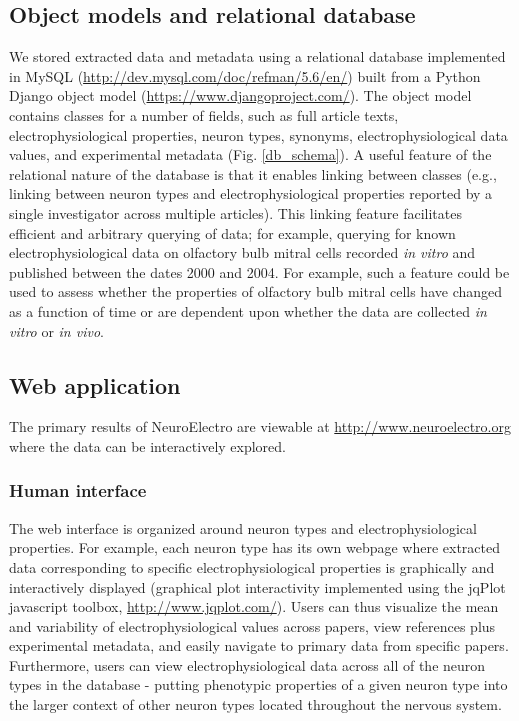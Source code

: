 \documentclass{template/frontiersSCNS} %
\begin{document}
\subsection{Object models and relational database}
We stored extracted data and metadata using a relational database implemented in MySQL (\url{http://dev.mysql.com/doc/refman/5.6/en/}) built from a Python Django object model (\url{https://www.djangoproject.com/}).  
The object model contains classes for a number of fields, such as full article texts, electrophysiological properties, neuron types, synonyms, electrophysiological data values, and experimental metadata (Fig. \ref{db_schema}).  
A useful feature of the relational nature of the database is that it enables linking between classes (e.g., linking between neuron types and electrophysiological properties reported by a single investigator across multiple articles). 
This linking feature facilitates efficient and arbitrary querying of data; 
for example, querying for known electrophysiological data on olfactory bulb mitral cells recorded \emph{in vitro} and published between the dates 2000 and 2004.  
For example, such a feature could be used to assess whether the properties of olfactory bulb mitral cells have changed as a function of time or are dependent upon whether the data are collected \emph{in vitro} or \emph{in vivo}.

\subsection{Web application}
The primary results of NeuroElectro are viewable at \url{http://www.neuroelectro.org} where the data can be interactively explored.  

\subsubsection{Human interface}
The web interface is organized around neuron types and electrophysiological properties.  
For example, each neuron type has its own webpage where extracted data corresponding to specific electrophysiological properties is graphically and interactively displayed (graphical plot interactivity implemented using the jqPlot javascript toolbox, \url{http://www.jqplot.com/}).  
Users can thus visualize the mean and variability of electrophysiological values across papers, view references plus experimental metadata, and easily navigate to primary data from specific papers.  Furthermore, users can view electrophysiological data across all of the neuron types in the database - putting phenotypic properties of a given neuron type into the larger context of other neuron types located throughout the nervous system.
\end{document}
